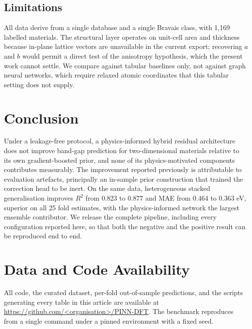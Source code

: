 \documentclass[journal]{IEEEtran}
\begin{document}
\subsection{Limitations}
All data derive from a single database and a single Bravais class, with 1{,}169
labelled materials. The structural layer operates on unit-cell area and
thickness because in-plane lattice vectors are unavailable in the current
export; recovering $a$ and $b$ would permit a direct test of the anisotropy
hypothesis, which the present work cannot settle. We compare against tabular
baselines only, not against graph neural networks, which require relaxed atomic
coordinates that this tabular setting does not supply.

\section{Conclusion}
Under a leakage-free protocol, a physics-informed hybrid residual architecture
does not improve band-gap prediction for two-dimensional materials relative to
its own gradient-boosted prior, and none of its physics-motivated components
contributes measurably. The improvement reported previously is attributable to
evaluation artefacts, principally an in-sample prior construction that trained
the correction head to be inert. On the same data, heterogeneous stacked
generalisation improves $R^2$ from $0.823$ to $0.877$ and MAE from $0.464$ to
$0.363$ eV, superior on all 25 fold estimates, with the physics-informed network
the largest ensemble contributor. We release the complete pipeline, including
every configuration reported here, so that both the negative and the positive
result can be reproduced end to end.

\section*{Data and Code Availability}
All code, the curated dataset, per-fold out-of-sample predictions, and the
scripts generating every table in this article are available at
\url{https://github.com/<organisation>/PINN-DFT}. The benchmark reproduces from
a single command under a pinned environment with a fixed seed.



\end{document}
